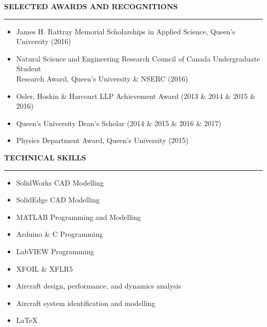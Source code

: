 \documentclass[11pt,letterpaper]{article}
\begin{document}
{\large\textbf{SELECTED AWARDS AND RECOGNITIONS}} %
\vspace{0.1cm}
\hrule
\vspace{-0.2cm}
\begin{itemize}
	\item James H. Rattray Memorial Scholarships in Applied Science, Queen's University \hfill (2016)
	\vspace{-0.25cm}
	\item Natural Science and Engineering Research Council of Canada Undergraduate Student\\ Research Award, Queen's University \& NSERC \hfill (2016)
	\vspace{-0.25cm}
	\item Osler, Hoskin \& Harcourt LLP Achievement Award \hfill (2013 \& 2014 \& 2015 \& 2016)
	\vspace{-0.25cm}
	\item Queen’s University Dean’s Scholar \hfill (2014 \& 2015 \& 2016 \& 2017)
	\vspace{-0.25cm}
	\item Physics Department Award, Queen's University \hfill (2015)
\end{itemize}


\vspace{0.2cm}
{\large\textbf{TECHNICAL SKILLS}}
\vspace{0.1cm}
\hrule
\vspace{-0.2cm}
\begin{multicols}{2}
	\begin{itemize}
		\item SolidWorks CAD Modelling
		\item SolidEdge CAD Modelling
		\item MATLAB Programming and Modelling
		\item Arduino \& C Programming
		\item LabVIEW Programming
		\item XFOIL \& XFLR5
		\item Aircraft design, performance, and dynamics analysis
		\item Aircraft system identification and modelling
		\item \LaTeX

	\end{itemize}
\end{multicols}
\end{document}
